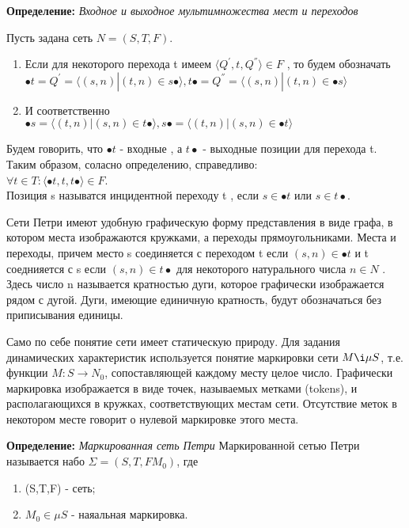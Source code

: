\documentclass[a4paper,14pt]{article}
\begin{document}
\textbf{Определение:}  \textit{Входное и выходное мультимножества мест и переходов}
\par Пусть задана сеть $N = (S,T,F)$.
\begin{enumerate}
\item Если для некоторого перехода t имеем $\langle Q^{'}, t, Q^{''} \rangle \in F$ , то будем обозначать \\$\bullet t = Q^{'} = \langle (s,n)|(t,n) \in s \bullet \rangle , t  \bullet = Q^{''} = \langle(s,n) | (t ,n) \in \bullet s \rangle$
\item  И соответственно\\$\bullet s = \langle (t,n)|(s,n) \in t \bullet \rangle , s \bullet = \langle(t,n) | (s ,n) \in \bullet t \rangle$
\end{enumerate}

Будем говорить, что $\bullet t$ - входные , а $t \bullet$ - выходные позиции для перехода t. Таким образом, соласно определению, справедливо:\\ $\forall t \in T : \langle \bullet t, t, t \bullet \rangle \in F $.\\ Позиция s называтся инцидентной переходу t , если $s \in \bullet t$ или $s \in t \bullet$.


Сети Петри имеют удобную графическую форму представления в виде графа, в котором места изображаются кружками, а переходы прямоугольниками. Места и переходы, причем место s соединяется с переходом t если $(s,n) \in \bullet t$ и t соеднияется с s если $(s,n) \in t \bullet$  для некоторого натурального числа $n \in N$ . Здесь число n называется кратностью дуги, которое графически изображается рядом с дугой. Дуги, имеющие единичную кратность, будут обозначаться без приписывания единицы. 

Само по себе понятие сети имеет статическую природу. Для задания динамических характеристик используется понятие маркировки сети $M \i \mu S$, т.е. функции $M : S \longrightarrow N_{0}$, сопоставляющей каждому месту целое число. Графически маркировка изображается в виде точек, называемых метками (tokens), и располагающихся в кружках, соответствующих местам сети. Отсутствие меток в некотором месте говорит о нулевой маркировке этого места.

\textbf{Определение:}  \textit{Маркированная сеть Петри}
Маркированной сетью Петри называется набо $\Sigma = (S,T,F M_{0})$, где
\begin{enumerate}
\item (S,T,F) - сеть;
\item $M_{0} \in  \mu S$ - наяальная маркировка.
\end{enumerate}
\end{document}

